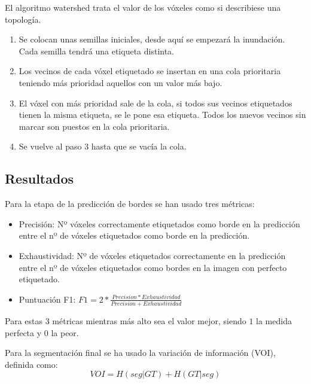 El algoritmo watershed trata el valor de los vóxeles como si describiese una topología.
\begin{enumerate}
\item Se colocan unas semillas iniciales, desde aquí se empezará la inundación. Cada semilla tendrá una etiqueta distinta.
\item Los vecinos de cada vóxel etiquetado se insertan en una cola prioritaria teniendo más prioridad aquellos con un valor más bajo.
\item El vóxel con más prioridad sale de la cola, si todos sus vecinos etiquetados tienen la misma etiqueta, se le pone esa etiqueta. Todos los nuevos vecinos sin marcar son puestos en la cola prioritaria.
\item Se vuelve al paso 3 hasta que se vacía la cola.
\end{enumerate}

\subsection{Resultados}\label{app2_results}


Para la etapa de la predicción de bordes se han usado tres métricas:
\begin{itemize}
\item Precisión: Nº vóxeles correctamente etiquetados como borde en la predicción entre el nº de vóxeles etiquetados como borde en la predicción.
\item Exhaustividad: Nº de vóxeles etiquetados correctamente en la predicción entre el nº de vóxeles etiquetados como bordes en la imagen con perfecto etiquetado.
\item Puntuación F1: $F1=2*\frac{Precision * Exhaustividad}{Precision+Exhaustividad}$
\end{itemize}

Para estas 3 métricas mientras más alto sea el valor mejor, siendo $1$ la medida perfecta y $0$ la peor.

Para la segmentación final se ha usado la variación de información (VOI), definida como:
\begin{equation}
VOI = H(seg|GT) + H(GT|seg)
\end{equation}

